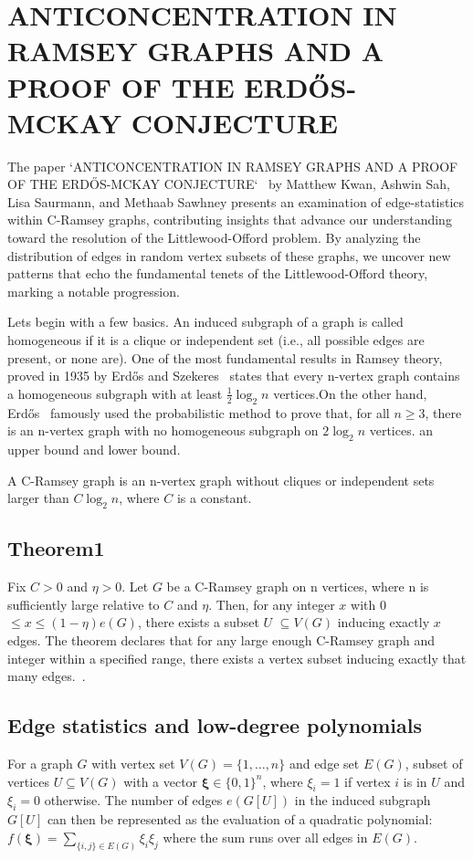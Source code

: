 \newpage


\section*{ANTICONCENTRATION IN RAMSEY GRAPHS AND A PROOF OF THE
ERDŐS-MCKAY CONJECTURE}
The paper `ANTICONCENTRATION IN RAMSEY GRAPHS AND A PROOF OF THE
ERDŐS-MCKAY CONJECTURE`~\cite{kwan2023anticoncentration}
by Matthew Kwan, Ashwin Sah, Lisa Saurmann, and Methaab Sawhney
presents an examination of edge-statistics within C-Ramsey graphs,
contributing insights that advance our understanding toward
the resolution of the Littlewood-Offord problem. 
By analyzing the distribution of edges in random vertex subsets of these graphs,
we uncover new patterns that echo the fundamental tenets of the 
Littlewood-Offord theory, marking a notable progression.

Lets begin with a few basics. An induced subgraph of a graph is called homogeneous 
if it is a clique or independent set (i.e., all possible edges are present, or none are).
One of the most fundamental results in Ramsey theory,
proved in 1935 by Erdős and Szekeres~\cite{erdos1935combinatorial}  states that every 
n-vertex graph contains a homogeneous subgraph with
at least $ \frac{1}{2} \log_2{n} $ vertices.On the other hand, Erdős~\cite{erdos1947some} famously used
the probabilistic method to prove that, for all $n \geq 3$, there is an n-vertex graph
with no homogeneous subgraph on $2 \log_2{n}$ vertices. an upper bound and lower bound.

A C-Ramsey graph is an n-vertex graph without cliques or independent sets 
larger than \(C \log_2 n\), where \(C\) is a constant.


\subsection{\textbf{Theorem1}} Fix  $C > 0$  and $ \eta > 0$. Let  $G$  be a  C-Ramsey graph on  n  vertices,
where  n  is sufficiently large relative to  $C$  and  $\eta$. Then, for any integer  $x$  with
0 $\leq x \leq (1 - \eta)e(G)$,  there exists a subset  $U$ $\subseteq V(G)$  inducing exactly 
$x$  edges.
The theorem declares that for any large enough C-Ramsey
graph and integer within a specified range, there exists a vertex
subset inducing exactly that many edges.~\cite{alon2003induced}.


\subsection{\textbf{Edge statistics and low-degree polynomials}}
For a graph $G$ with vertex set $V(G) = \{1, \ldots, n\}$ and edge set $E(G)$,
subset of vertices $U \subseteq V(G)$ with a vector
$\mathbf{\xi} \in \{0,1\}^n$, where $\xi_i = 1$ if vertex $i$ is in $U$ and $\xi_i = 0$ otherwise.
The number of edges $e(G[U])$ in the induced subgraph $G[U]$ can then be represented
as the evaluation of a quadratic polynomial: $f(\mathbf{\xi}) = \sum_{\{i,j\} \in E(G)} \xi_i \xi_j$
where the sum runs over all edges in $E(G)$. 

